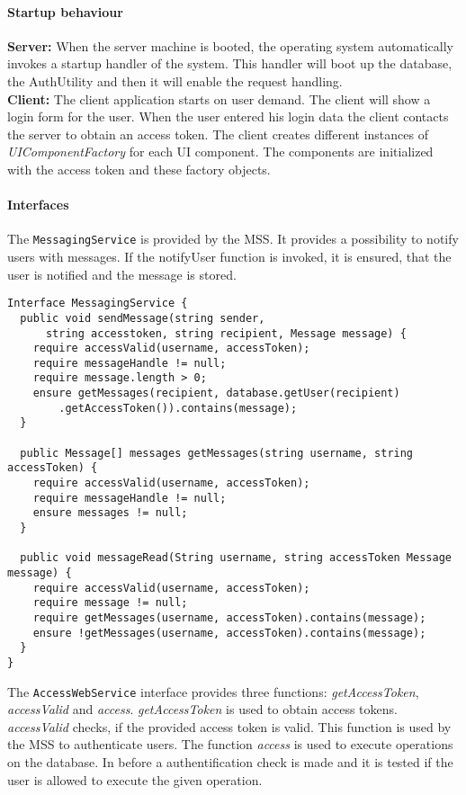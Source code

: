 			\paragraph{Startup behaviour}
				\textbf{Server:} When the server machine is booted, the operating system automatically invokes a startup handler of the system. This handler will boot up the database, the AuthUtility and then it will enable the request handling.\\
				\textbf{Client:} The client application starts on user demand. The client will show a login form for the user. When the user entered his login data the client contacts the server to obtain an access token. The client creates different instances of \emph{UIComponentFactory} for each UI component. The components are initialized with the access token and these factory objects.
			\paragraph{Interfaces}
				The \verb|MessagingService| is provided by the MSS. It provides a possibility to notify users with messages. If the notifyUser function is invoked, it is ensured, that the user is notified and the message is stored.
\begin{verbatim}
Interface MessagingService {
  public void sendMessage(string sender,
      string accesstoken, string recipient, Message message) {
    require accessValid(username, accessToken);
    require messageHandle != null;
    require message.length > 0;
    ensure getMessages(recipient, database.getUser(recipient)
        .getAccessToken()).contains(message);
  }

  public Message[] messages getMessages(string username, string accessToken) {
    require accessValid(username, accessToken);
    require messageHandle != null;
    ensure messages != null;
  }

  public void messageRead(String username, string accessToken Message message) {
    require accessValid(username, accessToken);
    require message != null;
    require getMessages(username, accessToken).contains(message);
    ensure !getMessages(username, accessToken).contains(message);
  }
}
\end{verbatim}
			The \verb|AccessWebService| interface provides three functions: \emph{getAccessToken}, \emph{accessValid} and \emph{access}. \emph{getAccessToken} is used to obtain access tokens. \emph{accessValid} checks, if the provided access token is valid. This function is used by the MSS to authenticate users. The function \emph{access} is used to execute operations on the database. In before a authentification check is made and it is tested if the user is allowed to execute the given operation.

